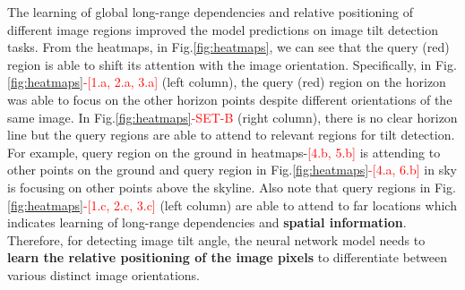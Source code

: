 \documentclass{bmvc2k}
\begin{document}
The learning of global long-range dependencies and relative positioning of different image regions improved the model predictions on image tilt detection tasks. From the heatmaps, in Fig.\ref{fig:heatmaps}, we can see that the query (red) region is able to shift its attention with the image orientation. Specifically, in Fig.\ref{fig:heatmaps}\textcolor{red}{-[1.a, 2.a, 3.a]} (left column), the query (red) region on the horizon was able to focus on the other horizon points despite different orientations of the same image. In Fig.\ref{fig:heatmaps}\textcolor{red}{-SET-B} (right column), there is no clear horizon line but the query regions are able to attend to relevant regions for tilt detection. 
For example, query region on the ground in heatmaps-\textcolor{red}{[4.b, 5.b]} is attending to other points on the ground and query region in Fig.\ref{fig:heatmaps}\textcolor{red}{-[4.a, 6.b]} in sky is focusing on other points above the skyline. 
Also note that query regions in Fig.\ref{fig:heatmaps}\textcolor{red}{-[1.c, 2.c, 3.c]} (left column) are able to attend to far locations which indicates learning of long-range dependencies and \textbf{spatial information}. Therefore, for detecting image tilt angle, the neural network model needs to \textbf{learn the relative positioning of the image pixels} to differentiate between various distinct image orientations. 
\end{document}

